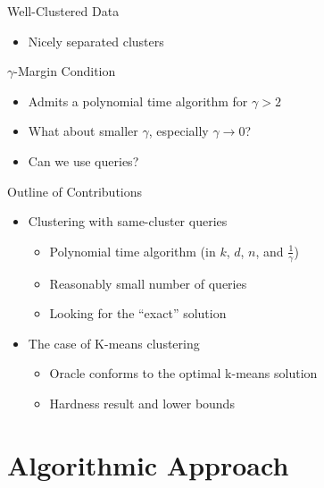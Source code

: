 \documentclass{beamer}
\begin{document}
\begin{frame}{Well-Clustered Data}
  \begin{itemize}
    
    \item Nicely separated clusters 

  \end{itemize}
\end{frame}


\begin{frame}{$\gamma$-Margin Condition}
  \begin{itemize}
	\item Admits a polynomial time algorithm for $\gamma > 2$
    \item What about smaller $\gamma$, especially $\gamma \rightarrow 0$?
    \item Can we use queries?

  \end{itemize}
\end{frame}



\begin{frame}{Outline of Contributions}
  \begin{itemize}
    
    \item Clustering with same-cluster queries
    
    \begin{itemize}
        \item Polynomial time algorithm (in $k$, $d$, $n$, and $\frac{1}{\gamma}$)
        \item Reasonably small number of queries
        \item Looking for the ``exact'' solution
    \end{itemize}
    
    \pause
    \item The case of K-means clustering
    \begin{itemize}
        \item Oracle conforms to the optimal k-means solution
        \item Hardness result and lower bounds
    \end{itemize}

  \end{itemize}
\end{frame}

\section{Algorithmic Approach}
\end{document}

